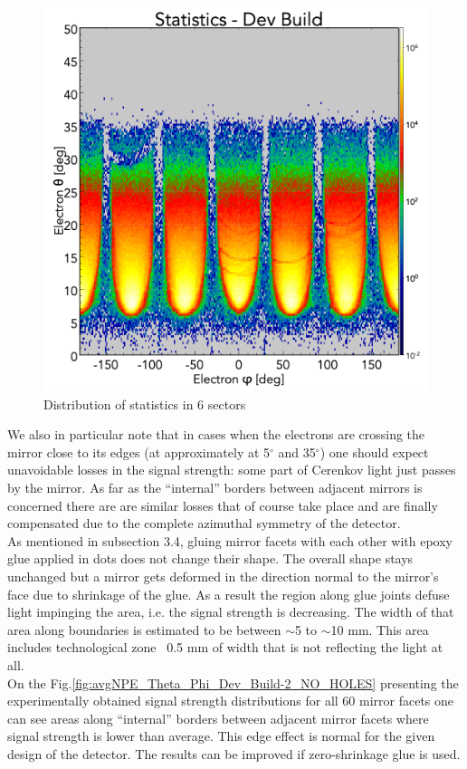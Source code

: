 \begin{figure}[!ht]
    \centering
    \includegraphics[width=1.0\linewidth,trim={0.0cm 0.0cm 0.0cm 1.67cm},clip]{images/statistics_Theta_Phi_Dev_Build_NO_HOLES.png}
    \caption{Distribution of statistics in 6 sectors}
    \label{fig:statistics_Theta_Phi_Dev_Build_NO_HOLES}
\end{figure}
We also in particular note that in cases when the electrons are crossing the mirror close to its edges (at approximately at
5$^\circ$ and 35$^\circ$) one should expect unavoidable losses in the signal strength: some part of Cerenkov light just passes by the mirror. As far as the “internal” borders between adjacent mirrors is concerned there are are similar losses that of course take place and are finally compensated due to the complete azimuthal symmetry of the detector.\\
\indent As mentioned in subsection 3.4, gluing mirror facets with each other with epoxy glue applied in dots does not change their shape. The overall shape stays unchanged but a mirror gets deformed in the direction normal to the mirror’s face due to shrinkage of the glue. As a result the region along glue joints defuse light impinging the area, i.e. the signal strength is decreasing. The width of that area along boundaries is estimated to be between $\sim$5 to $\sim$10 mm. This area includes technological zone ~0.5 mm of width that is not reflecting the light at all.\\
\indent On the Fig.\ref{fig:avgNPE_Theta_Phi_Dev_Build-2_NO_HOLES} presenting the experimentally obtained signal strength distributions for all 60 mirror facets one can see areas along “internal” borders between adjacent mirror facets where signal strength is lower than average. This edge effect is normal for the given design of the detector. The results can be improved if zero-shrinkage glue is used. 
